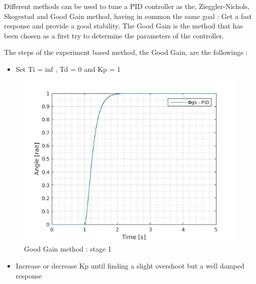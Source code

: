Different methods can be used to tune a PID controller as the, Zieggler-Nichols, Skogestad and Good Gain method, having in common the same goal : Get a fast response and provide a good stability. The Good Gain is the method that has been chosen as a first try to determine the parameters of the controller.\par
  
The steps of the experiment based method, the Good Gain, are the followings :\par 
  
\begin{itemize}
  \item Set Ti = inf , Td = 0 and Kp = 1
\end{itemize}
  
  \begin{figure}[H]
    \centering
    \includegraphics[scale=0.4]{figures/GG1.jpg}
    \caption[LABEL] {Good Gain method : stage 1} 
  \end{figure}
  

\begin{itemize}
  \item Increase or decrease Kp until finding a slight overshoot but a well damped response
\end{itemize}
  
